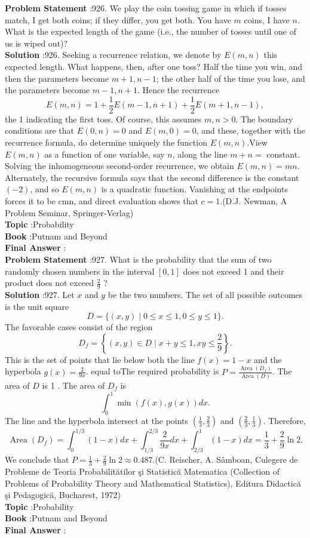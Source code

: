 \documentclass[10pt]{article}
\begin{document}
\textbf{Problem Statement} :926. We play the coin tossing game in which if tosses match, I get both coins; if they differ, you get both. You have $m$ coins, I have $n$. What is the expected length of the game (i.e., the number of tosses until one of us is wiped out)?\\
\textbf{Solution} :926. Seeking a recurrence relation, we denote by $E(m, n)$ this expected length. What happens, then, after one toss? Half the time you win, and then the parameters become $m+1, n-1$; the other half of the time you lose, and the parameters become $m-1, n+1$. Hence the recurrence$$ E(m, n)=1+\frac{1}{2} E(m-1, n+1)+\frac{1}{2} E(m+1, n-1), $$the 1 indicating the first toss. Of course, this assumes $m, n>0$. The boundary conditions are that $E(0, n)=0$ and $E(m, 0)=0$, and these, together with the recurrence formula, do determine uniquely the function $E(m, n)$.View $E(m, n)$ as a function of one variable, say $n$, along the line $m+n=$ constant. Solving the inhomogeneous second-order recurrence, we obtain $E(m, n)=m n$. Alternately, the recursive formula says that the second difference is the constant $(-2)$, and so $E(m, n)$ is a quadratic function. Vanishing at the endpoints forces it to be $\mathrm{cmn}$, and direct evaluation shows that $c=1$.(D.J. Newman, A Problem Seminar, Springer-Verlag)\\
\textbf{Topic} :Probability\\
\textbf{Book} :Putnam and Beyond\\
\textbf{Final Answer} :\\


\textbf{Problem Statement} :927. What is the probability that the sum of two randomly chosen numbers in the interval $[0,1]$ does not exceed 1 and their product does not exceed $\frac{2}{9}$ ?\\
\textbf{Solution} :927. Let $x$ and $y$ be the two numbers. The set of all possible outcomes is the unit square$$ D=\{(x, y) \mid 0 \leq x \leq 1,0 \leq y \leq 1\} . $$The favorable cases consist of the region$$ D_{f}=\left\{(x, y) \in D \mid x+y \leq 1, x y \leq \frac{2}{9}\right\} . $$This is the set of points that lie below both the line $f(x)=1-x$ and the hyperbola $g(x)=\frac{2}{9 x}$. equal toThe required probability is $P=\frac{\operatorname{Area}\left(D_{f}\right)}{\operatorname{Area}(D)}$. The area of $D$ is 1 . The area of $D_{f}$ is$$ \int_{0}^{1} \min (f(x), g(x)) d x . $$The line and the hyperbola intersect at the points $\left(\frac{1}{3}, \frac{2}{3}\right)$ and $\left(\frac{2}{3}, \frac{1}{3}\right)$. Therefore,$$ \operatorname{Area}\left(D_{f}\right)=\int_{0}^{1 / 3}(1-x) d x+\int_{1 / 3}^{2 / 3} \frac{2}{9 x} d x+\int_{2 / 3}^{1}(1-x) d x=\frac{1}{3}+\frac{2}{9} \ln 2 . $$We conclude that $P=\frac{1}{3}+\frac{2}{9} \ln 2 \approx 0.487$.(C. Reischer, A. Sâmboan, Culegere de Probleme de Teoria Probabilitătilor şi Statistică Matematica (Collection of Problems of Probability Theory and Mathematical Statistics), Editura Didactică şi Pedagogică, Bucharest, 1972)\\
\textbf{Topic} :Probability\\
\textbf{Book} :Putnam and Beyond\\
\textbf{Final Answer} :\\
\end{document}
